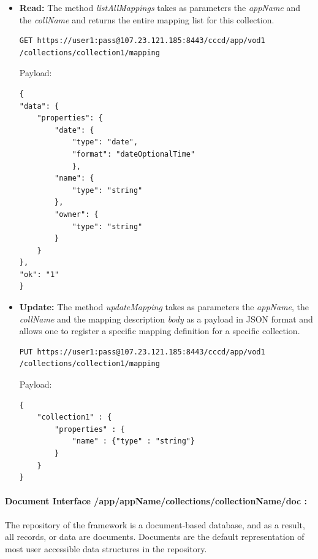 \begin{itemize}

\item \textbf{Read:} The method \textit{listAllMappings} takes as parameters the \textit{appName} and the \textit{collName} and returns the entire mapping list for this collection.

\begin{code}
\begin{verbatim}
GET https://user1:pass@107.23.121.185:8443/cccd/app/vod1
/collections/collection1/mapping
\end{verbatim}
Payload:
\begin{verbatim}
{
"data": {
	"properties": {
		"date": {
			"type": "date",
			"format": "dateOptionalTime"
			},
		"name": {
			"type": "string"
		},
		"owner": {
			"type": "string"
		}
	}
},
"ok": "1"
}

\end{verbatim}
\end{code}

\item \textbf{Update:} The method \textit{updateMapping} takes as parameters the \textit{appName}, the \textit{collName} and the mapping description \textit{body} as a payload in \ac{JSON} format and allows one to register a specific mapping definition for a specific collection.

\begin{code}
\begin{verbatim}
PUT https://user1:pass@107.23.121.185:8443/cccd/app/vod1
/collections/collection1/mapping
\end{verbatim}
Payload:
\begin{verbatim}
{
	"collection1" : {
		"properties" : {
			"name" : {"type" : "string"}
		}
	}
}
\end{verbatim}
\end{code}

\end{itemize}


\paragraph{Document Interface /app/{appName}/collections/{collectionName}/doc :} The repository of the framework is a document-based database, and as a result, all records, or data are documents. Documents are the default representation of most user accessible data structures in the repository.

